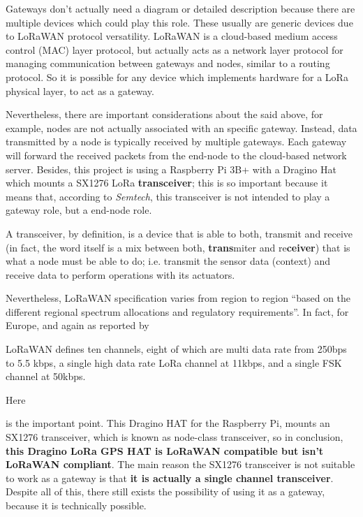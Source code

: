 \documentclass[11pt,a4paper,dvipsnames,twoside]{article}
\newcounter{subsubsubsection}[subsubsection]
\begin{document}
Gateways don't actually need a diagram or detailed description because there are multiple devices which could play this role. These usually are generic devices due to LoRaWAN protocol versatility. LoRaWAN is a cloud-based medium access control (MAC) layer protocol, but actually acts as a network layer protocol for managing communication between gateways and nodes, similar to a routing protocol. So it is possible for any device which implements hardware for a LoRa physical layer, to act as a gateway.

Nevertheless, there are important considerations about the said above, for example, nodes are not actually associated with an specific gateway. Instead, data transmitted by a node is typically received by multiple gateways. Each gateway will forward the received packets from the end-node to the cloud-based network server. Besides, this project is using a Raspberry Pi 3B+ with a Dragino Hat which mounts a SX1276 LoRa \textbf{transceiver}\cite{SX1276}; this is so important because it means that, according to \textit{Semtech}, this transceiver is not intended to play a gateway role, but a end-node role.

A transceiver, by definition, is a device that is able to both, transmit and receive (in fact, the word itself is a mix between both, \textbf{trans}miter and re\textbf{ceiver}) that is what a node must be able to do; i.e. transmit the sensor data (context) and receive data to perform operations with its actuators.

Nevertheless, LoRaWAN specification varies from region to region \enquote{based on
the different regional spectrum allocations and regulatory requirements}\cite[p.~12]{LoRaWANspec}. In fact, for Europe, and again as reported by \cite[p.~13]{LoRaWANspec}

\begin{quoting}
LoRaWAN defines ten channels, eight of which are multi data rate from 250bps to
5.5 kbps, a single high data rate LoRa channel at 11kbps, and a single FSK channel
at 50kbps.
\end{quoting}

\hypertarget{Raspi_HAT}{Here} is the important point. This Dragino HAT for the Raspberry Pi, mounts an SX1276 transceiver, which is known as node-class transceiver, so in conclusion, \textbf{this Dragino LoRa GPS HAT is LoRaWAN compatible but isn't LoRaWAN compliant}. The main reason the SX1276 transceiver is not suitable to work as a gateway is that \textbf{it is actually a single channel transceiver}. Despite all of this, there still exists the possibility of using it as a gateway, because it is technically possible.
\end{document}
